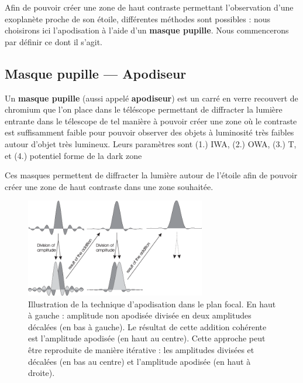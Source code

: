 Afin de pouvoir créer une zone de haut contraste permettant l'observation d'une exoplanète proche de son étoile, différentes méthodes sont possibles : nous choisirons ici l’apodisation à l’aide d’un \textbf{masque pupille}. Nous commencerons par définir ce dont il s'agit.

\subsection{Masque pupille — Apodiseur}

Un \textbf{masque pupille} (aussi appelé \textbf{apodiseur}) est un carré en verre recouvert de chromium que l'on place dans le téléscope permettant de diffracter la lumière entrante dans le télescope de tel manière à pouvoir créer une zone où le contraste est suffisamment faible pour pouvoir observer des objets à luminosité très faibles autour d'objet très lumineux.  Leurs paramètres sont (1.) IWA, (2.) OWA, (3.) T, et (4.) potentiel forme de la dark zone

Ces masques permettent de diffracter la lumière autour de l’étoile afin de pouvoir créer une zone de haut contraste dans une zone souhaitée.


\begin{figure}[htbp]
    \centering
    \includegraphics[width=0.7\textwidth]{figures/apod_explanation.png}
    \caption{Illustration de la technique d'apodisation dans le plan focal. En haut à gauche : amplitude non apodisée divisée en deux amplitudes décalées (en bas à gauche). Le résultat de cette addition cohérente est l'amplitude apodisée (en haut au centre). Cette approche peut être reproduite de manière itérative : les amplitudes divisées et décalées (en bas au centre) et l'amplitude apodisée (en haut à droite). }%
\end{figure}

